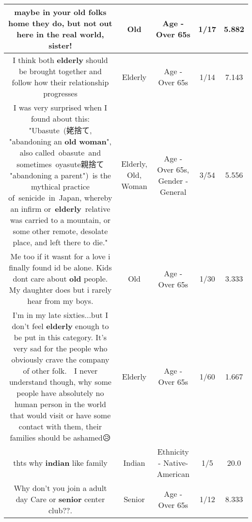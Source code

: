 \documentclass[11pt]{article}
\newlength\mylength
\begin{document}
\begin{center}
\begin{longtable}{|C{.65\mylength}|C{.30\mylength}|C{.12\mylength}|C{.12\mylength}|C{.12\mylength}|}
  \small maybe in your \textbf{old} folks home they do, but not out here in the real world, sister!\normalsize   & Old & Age - Over 65s & 1/17 & 5.882 \\  \hline
  \small I think both \textbf{elderly} should be brought together and follow how their relationship progresses\normalsize   & Elderly & Age - Over 65s & 1/14 & 7.143 \\  \hline
  \small I was very surprised when I found about this: "Ubasute (姥捨て, "abandoning an \textbf{old} \textbf{woman}", also called obasute and sometimes oyasute親捨て "abandoning a parent") is the mythical practice of senicide in Japan, whereby an infirm or \textbf{elderly} relative was carried to a mountain, or some other remote, desolate place, and left there to die."\normalsize   & Elderly, Old, Woman & Age - Over 65s, Gender - General & 3/54 & 5.556 \\  \hline
  \small Me too if it wasnt for a love i finally found id be alone. Kids dont care about \textbf{old} people. My daughter does but i rarely hear from my boys.\normalsize   & Old & Age - Over 65s & 1/30 & 3.333 \\  \hline
  \small I'm in my late sixties...but I don't feel \textbf{elderly} enough to be put in this category.   It's very sad for the people who obviously crave the company of other folk.  🙁 I never understand though, why some people have absolutely no human person in the world that would visit or have some contact with them, their families should be ashamed😥\normalsize   & Elderly & Age - Over 65s & 1/60 & 1.667 \\  \hline
  \small thts why \textbf{indian} like family\normalsize   & Indian & Ethnicity - Native-American & 1/5 & 20.0 \\  \hline
  \small Why don't you join a adult day Care or \textbf{senior} center club??.\normalsize   & Senior & Age - Over 65s & 1/12 & 8.333 \\  \hline

\end{longtable}
\end{center}
\end{document}

